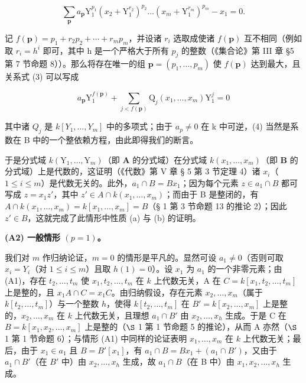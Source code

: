 \[
\sum_ {\mathbf {p}} a _ {\mathbf {p}} \mathrm{Y} _ {1} ^ {p _ {1}} (x _ {2} + \mathrm{Y} _ {1} ^ {r _ {2}}) ^ {p _ {2}} \dots (x _ {m} + \mathrm{Y} _ {1} ^ {r _ {m}}) ^ {p _ {m}} - x _ {1} = 0.\tag{3}
\]

记 \(f(\mathbf{p}) = p_{1} + r_{2}p_{2} + \cdots + r_{m}p_{m}\)，并设诸 \(r_{i}\) 选取成使诸 \(f(\mathbf{p})\) 互不相同（例如取 \(r_{i} = h^{i}\) 即可，其中 h 是一个严格大于所有 \(p_{j}\) 的整数（《集合论》第 III 章 §5 第 7 节命题 8））。那么将存在唯一的组 \(\mathbf{p} = (p_{1}, \ldots, p_{m})\) 使 \(f(\mathbf{p})\) 达到最大，且关系式 (3) 可以写成

\[
a _ {\mathbf {p}} \mathrm{Y} _ {1} ^ {f (\mathbf {p})} + \sum_ {j <   f (\mathbf {p})} \mathrm{Q} _ {j} (x _ {1}, \dots , x _ {m}) \mathrm{Y} _ {1} ^ {j} = 0\tag{4}
\]

其中诸 \(Q_{j}\) 是 \(k[Y_{1},\ldots,Y_{m}]\) 中的多项式；由于 \(a_{p} \neq 0\) 在 k 中可逆，(4) 当然是系数在 B 中的一个整依赖方程，由此即得我们的断言。

于是分式域 \(k(\mathrm{Y}_1, \ldots, \mathrm{Y}_m)\)（即 \(\mathbf{A}\) 的分式域）在分式域 \(k(x_1, \ldots, x_m)\)（即 \(\mathbf{B}\) 的分式域）上是代数的，这证明（《代数》第 V 章 § 5 第 3 节定理 4）诸 \(x_i\)（\(1 \leqslant i \leqslant m\)）是代数无关的。此外，\(a_1 \cap B = Bx_1\)；因为每个元素 \(z \in a_1 \cap B\) 都可写成 \(z = x_1z'\)，其中 \(z' \in A \cap k(x_1, \ldots, x_m)\)；而由于 B 是整闭的，有 \(A \cap k(x_1, \ldots, x_m) = k[x_1, \ldots, x_m] = B\)（§ 1 第 3 节命题 13 的推论 2）；因此 \(z' \in B\)，这就完成了此情形中性质 (a) 与 (b) 的证明。

\textbf{(A2) 一般情形 \((p = 1)\)。}\par

我们对 \(m\) 作归纳论证，\(m = 0\) 的情形是平凡的。显然可设 \(a_1 \neq 0\)（否则可取 \(x_i = Y_i\)（对 \(1 \leqslant i \leqslant m\)）且取 \(h(1) = 0\)）。设 \(x_1\) 为 \(a_1\) 的一个非零元素；由 (A1)，存在 \(t_2, \ldots, t_m\) 使 \(x_1, t_2, \ldots, t_m\) 在 \(k\) 上代数无关，A 在 \(C = k[x_1, t_2, \ldots, t_m]\) 上是整的，且 \(x_1A \cap C = x_1C\)。由归纳假设，存在元素 \(x_2, \ldots, x_m\)（属于 \(k[t_2, \ldots, t_m]\)）与一个整数 \(h\)，使得 \(k[t_2, \ldots, t_m]\) 在 \(B' = k[x_2, \ldots, x_m]\) 上是整的，\(x_2, \ldots, x_m\) 在 \(k\) 上代数无关，且理想 \(a_1 \cap B'\) 由 \(x_2, \ldots, x_h\) 生成。于是 C 在 \(B = k[x_1, x_2, \ldots, x_m]\) 上是整的（\(\S\) 1 第 1 节命题 5 的推论），从而 A 亦然（\(\S\) 1 第 1 节命题 6）；与情形 (A1) 中同样的论证表明 \(x_1, \ldots, x_m\) 在 \(k\) 上代数无关；最后，由于 \(x_1 \in a_1\) 且 \(B = B'[x_1]\)，有 \(a_1 \cap B = Bx_1 + (a_1 \cap B')\)，又由于 \(a_1 \cap B'\)（在 \(B'\) 中）由 \(x_2, \ldots, x_h\) 生成，故 \(a_1 \cap B\)（在 B 中）由 \(x_1, x_2, \ldots, x_h\) 生成。


